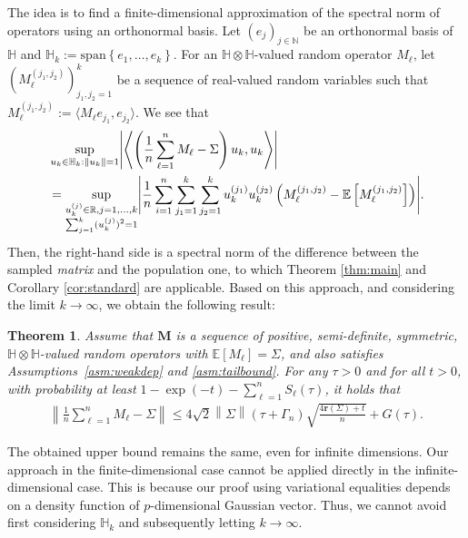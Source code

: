 \documentclass[11pt,a4paper]{article}
\newtheorem{theorem}{Theorem}%
\theoremstyle{remark}
\theoremstyle{definition}
\theoremstyle{definition}
\newcommand{\Ep}{\mathbb{E}}
\newcommand{\Surv}{S}
\DeclarePairedDelimiter{\bigabs}{\Bigg\lvert}{\Bigg\rvert}
\newcommand{\rc}{\color{black}}
\begin{document}
\begin{bibunit}[apalike]
The idea is to find a finite-dimensional approximation of the spectral norm of operators using an orthonormal basis.
Let $(e_{j})_{j \in \mathbb{N}}$ be an orthonormal basis of $\mathbb{H}$ and $\mathbb{H}_{k}:=\mathrm{span}\left\{e_{1},\ldots,e_{k}\right\}$.
For an $\mathbb{H}\otimes\mathbb{H}$-valued random operator $M_{\ell}$, let $( M_{\ell}^{\left(j_{1},j_{2}\right)})_{j_1,j_2=1}^k$ be a sequence of real-valued random variables such that $M_{\ell}^{\left(j_{1},j_{2}\right)}:=\langle M_{\ell}e_{j_{1}},e_{j_{2}}\rangle$.
We see that
\begin{align*}
    &\sup_{u_{k}\in \mathbb{H}_{k} : \|u_{k}\|=1} \bigabs{ \left\langle \left(\frac{1}{n}\sum_{\ell=1}^{n}M_{\ell}-\Sigma\right)u_{k},u_{k}\right\rangle }\\
    &=\sup_{\substack{u_{k}^{(j)}\in\mathbb{R},j=1,\ldots,k\\\sum_{j=1}^{k}(u_{k}^{(j)})^{2}=1}}\bigabs{\frac{1}{n}\sum_{i=1}^{n}\sum_{j_{1}=1}^{k}\sum_{j_{2}=1}^{k}u_{k}^{\left(j_{1}\right)}u_{k}^{\left(j_{2}\right)}\left(M_{\ell}^{\left(j_{1},j_{2}\right)} - \Ep\left[M_{\ell}^{\left(j_{1},j_{2}\right)}\right] \right) }. 
\end{align*}
Then, the right-hand side is a spectral norm of the difference between the sampled \textit{matrix} and the population one, to which Theorem \ref{thm:main} and Corollary \ref{cor:standard} are applicable.
Based on this approach, and considering the limit $k \to \infty$, we obtain the following result:
\begin{theorem} \label{thm:operator}
Assume that $\mathbf{M}$ is a sequence of positive, semi-definite, symmetric, $\mathbb{H}\otimes\mathbb{H}$-valued random operators with $\Ep\left[M_{\ell}\right]=\Sigma$, and also satisfies Assumptions~\ref{asm:weakdep} and \ref{asm:tailbound}. 
For any $\tau>0$ and for all $t>0$, with probability at least $1-\exp(-t)- \sum_{\ell=1}^n \Surv_\ell(\tau)$, it holds that
\begin{align*}
    \left\|\frac{1}{n}\sum_{\ell=1}^{n} M_{\ell}-\Sigma\right\|\le{ 4}\sqrt{2}\left\|\Sigma\right\|\left({ \tau+\Gamma_{n}}\right)\sqrt{\frac{4\mathbf{r}\left(\Sigma\right)+t}{n}} + G(\tau).
\end{align*}
\end{theorem}
The obtained upper bound remains the same, even for infinite dimensions. Our approach in the finite-dimensional case cannot be applied directly in the infinite-dimensional case. This is because our proof using variational equalities depends on a density function of $p$-dimensional Gaussian vector. {\rc Thus, we cannot avoid first considering $\mathbb{H}_k$ and subsequently letting $k\rightarrow\infty$}.


\end{bibunit}
\end{document}
